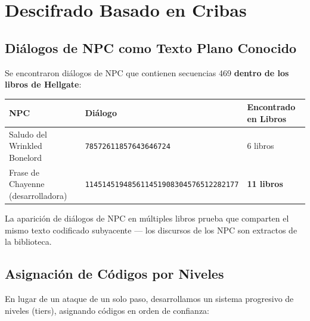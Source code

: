 \documentclass[11pt,a4paper]{article}
\begin{document}
\section{Descifrado Basado en Cribas}

\subsection{Di\'{a}logos de NPC como Texto Plano Conocido}

Se encontraron di\'{a}logos de NPC que contienen secuencias 469 \textbf{dentro de los libros de Hellgate}:

\begin{table}[h]
\centering
\begin{tabular}{lll}
\toprule
NPC & Di\'{a}logo & Encontrado en Libros \\
\midrule
Saludo del Wrinkled Bonelord & \texttt{78572611857643646724} & 6 libros \\
Frase de Chayenne (desarrolladora) & \texttt{114514519485611451908304576512282177} & \textbf{11 libros} \\
\bottomrule
\end{tabular}
\end{table}

La aparici\'{o}n de di\'{a}logos de NPC en m\'{u}ltiples libros prueba que comparten el mismo texto codificado subyacente --- los discursos de los NPC son extractos de la biblioteca.

\subsection{Asignaci\'{o}n de C\'{o}digos por Niveles}

En lugar de un ataque de un solo paso, desarrollamos un sistema progresivo de niveles (tiers), asignando c\'{o}digos en orden de confianza:

\begin{table}[h]
\centering
{}
\end{table}
\end{document}
